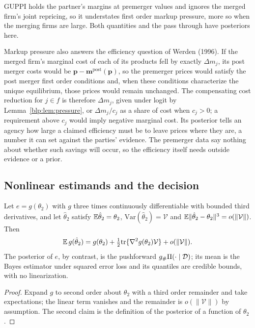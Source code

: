 GUPPI holds the partner's margins at premerger values and ignores the merged firm's joint repricing, so it understates first order markup pressure, more so when the merging firms are large. Both quantities and the pass through have posteriors here.

Markup pressure also answers the efficiency question of Werden (1996). If the merged firm's marginal cost of each of its products fell by exactly $\Delta m_j$, its post merger costs would be $\bm p - \bm m^{\mathrm{post}}(\bm p)$, so the premerger prices would satisfy the post merger first order conditions and, when these conditions characterize the unique equilibrium, those prices would remain unchanged. The compensating cost reduction for $j\in f$ is therefore $\Delta m_j$, given under logit by Lemma~\ref{blp:lem:pressure}, or $\Delta m_j/c_j$ as a share of cost when $c_j>0$; a requirement above $c_j$ would imply negative marginal cost. Its posterior tells an agency how large a claimed efficiency must be to leave prices where they are, a number it can set against the parties' evidence. The premerger data say nothing about whether such savings will occur, so the efficiency itself needs outside evidence or a prior.

\subsection{Nonlinear estimands and the decision}

\begin{proposition}\label{blp:prop:pushforward}
Let $e = g(\theta_2)$ with $g$ three times continuously differentiable with bounded third derivatives, and let $\hat\theta_2$
satisfy $\mathbb{E}\hat\theta_2 = \theta_2$, $\mathrm{Var}(\hat\theta_2) = \mathcal V$ and
$\mathbb{E}\lVert\hat\theta_2-\theta_2\rVert^3 = o(\lVert \mathcal V\rVert)$. Then
\[
\mathbb{E}\,g(\hat\theta_2) = g(\theta_2) + \tfrac12\mathrm{tr}\{\nabla^2 g(\theta_2)\mathcal V\} + o(\lVert \mathcal V\rVert).
\]
The posterior of $e$, by contrast, is the pushforward $g_\#\Pi(\cdot\mid\mathcal{D})$; its mean is the
Bayes estimator under squared error loss and its quantiles are credible bounds, with no
linearization.
\end{proposition}
\begin{proof}
Expand $g$ to second order about $\theta_2$ with a third order remainder and take expectations;
the linear term vanishes and the remainder is $o(\lVert \mathcal V\rVert)$ by assumption. The second claim
is the definition of the posterior of a function of $\theta_2$.
\end{proof}

